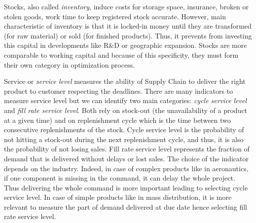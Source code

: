 Stocks, also called \emph{inventory}, induce costs for storage space, insurance, broken or stolen goods, work time to keep registered stock accurate.
However, main characteristic of inventory is that it is locked-in money until they are transformed (for raw material) or sold (for finished products).
Thus, it prevents from investing this capital in developments like R\&D or geographic expansion.
Stocks are more comparable to working capital and because of this specificity, they must form their own category in optimization process.



Service or \emph{service level} measures the ability of Supply Chain to deliver the right product to customer respecting the deadlines.
There are many indicators to measure service level but we can identify two main categories: \emph{cycle service level} and \emph{fill rate service level}.
Both rely on stock-out (\ie the unavailability of a product at a given time) and on replenishment cycle which is the time between two consecutive replenishments of the stock.
Cycle service level is the probability of not hitting a stock-out during the next replenishment cycle, and thus, it is also the probability of not losing sales.
Fill rate service level represents the fraction of demand that is delivered without delays or lost sales.
The choice of the indicator depends on the industry.
Indeed, in case of complex products like in aeronautics, if one component is missing in the command, it can delay the whole project.
Thus delivering the whole command is more important leading to selecting cycle service level.
In case of simple products like in mass distribution, it is more relevant to measure the part of demand delivered at due date hence selecting fill rate service level.



